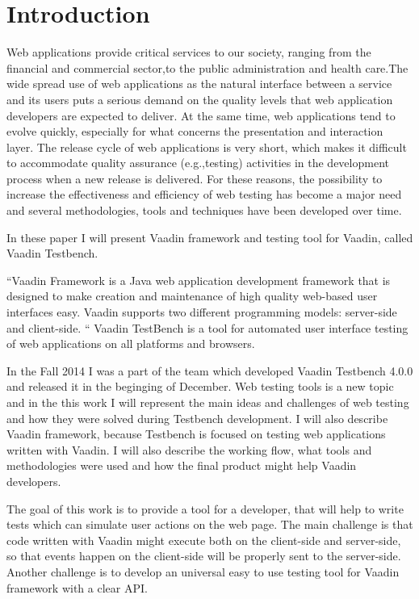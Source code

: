 	
	 \chapter{Introduction}
	 \label{ch:intro} 		
	 Web applications provide critical services to our society,
	 ranging from the financial and commercial sector,to the public
	 administration and health care.The wide spread use of web
	 applications as the natural interface between a service and its
	 users puts a serious demand on the quality levels that web
	 application developers are expected to deliver. At the same time,
	 web applications tend to evolve quickly, especially for what
	 concerns the presentation and interaction layer. The release
	 cycle of web applications is very short, which makes it difficult
	 to accommodate quality assurance (e.g.,testing) activities in 
	 the development process when a new release is delivered. For
	 these reasons, the possibility to increase the effectiveness and
	 efficiency of web testing has become a major need and several 
	 methodologies, tools and techniques have been developed over time.
	 
	 In these paper I will present Vaadin framework and testing tool for Vaadin,
	 called Vaadin Testbench.
	
	``Vaadin Framework is a Java web application development framework that is
	designed to make creation and maintenance of high quality web-based user interfaces easy.
	 Vaadin supports two different programming models: server-side and client-side. 
	 `` \cite[pr1.1]{bookVaaidn}
	 Vaadin TestBench is a tool for automated user interface testing of web
	 applications on all platforms and browsers. \cite{vaadinTestbenchSite}
	 
	 In the Fall 2014 I was a part of the team which developed Vaadin Testbench
	 4.0.0 and released it in the beginging of December. Web testing tools is a
	 new topic and in the this work I will represent the main ideas and challenges
	 of web testing and how they were solved during Testbench development. I will
	 also describe Vaadin framework, because Testbench is focused on testing web
	 applications written with Vaadin. I will also describe the working flow, what
	 tools and methodologies were used and how the final product might help Vaadin
	 developers.
	 
	 The goal of this work is to provide a tool for a developer, that will help to
	 write tests which can simulate user actions on the web page. The main
	 challenge is that code written with Vaadin might execute both on the
	 client-side and server-side, so that events happen on the client-side will be
	 properly sent to the server-side. Another challenge is to develop an universal
	 easy to use testing tool for Vaadin framework with a clear API.
	 
